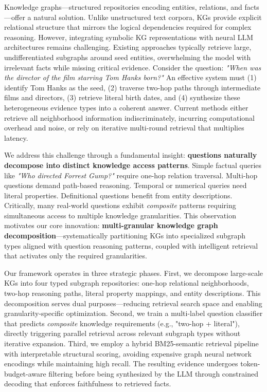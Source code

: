 \documentclass[conference]{IEEEtran}
\begin{document}
Knowledge graphs---structured repositories encoding entities, relations, and facts---offer a natural solution. Unlike unstructured text corpora, KGs provide explicit relational structure that mirrors the logical dependencies required for complex reasoning. However, integrating symbolic KG representations with neural LLM architectures remains challenging. Existing approaches typically retrieve large, undifferentiated subgraphs around seed entities, overwhelming the model with irrelevant facts while missing critical evidence. Consider the question: \emph{"When was the director of the film starring Tom Hanks born?"} An effective system must (1) identify Tom Hanks as the seed, (2) traverse two-hop paths through intermediate films and directors, (3) retrieve literal birth dates, and (4) synthesize these heterogeneous evidence types into a coherent answer. Current methods either retrieve all neighborhood information indiscriminately, incurring computational overhead and noise, or rely on iterative multi-round retrieval that multiplies latency.

We address this challenge through a fundamental insight: \textbf{questions naturally decompose into distinct knowledge access patterns}. Simple factual queries like \emph{"Who directed Forrest Gump?"} require one-hop relation traversal. Multi-hop questions demand path-based reasoning. Temporal or numerical queries need literal properties. Definitional questions benefit from entity descriptions. Critically, many real-world questions exhibit \emph{composite} patterns requiring simultaneous access to multiple knowledge granularities. This observation motivates our core innovation: \textbf{multi-granular knowledge graph decomposition}---systematically partitioning KGs into specialized subgraph types aligned with question reasoning patterns, coupled with intelligent retrieval that activates only the required granularities.

Our framework operates in three strategic phases. First, we decompose large-scale KGs into four typed subgraph repositories: one-hop relational neighborhoods, two-hop reasoning paths, literal property mappings, and entity descriptions. This decomposition serves dual purposes---reducing retrieval search space and enabling granularity-specific optimization. Second, we train a multi-label question classifier that predicts \emph{composite} knowledge requirements (e.g., "two-hop + literal"), directly triggering parallel retrieval across relevant subgraph types without iterative expansion. Third, we employ a hybrid BM25-semantic retrieval pipeline with interpretable structural scoring, avoiding expensive graph neural network encodings while maintaining high recall. The resulting evidence undergoes token-budget-aware filtering before being synthesized by the LLM through constrained decoding that enforces faithfulness to retrieved facts.
\end{document}

